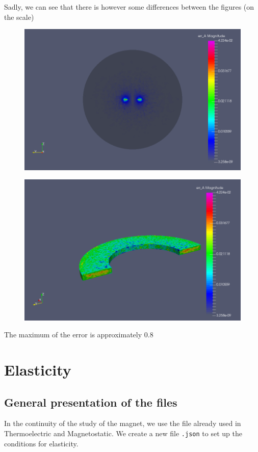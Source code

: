 \documentclass[11pt]{amsart}
\begin{document}
Sadly, we can see that there is however some differences between the figures (on the scale)


\begin{figure}
\centering\includegraphics[width=4.75truein]{./images/learning/magnetostatic/Cartesian_potential_error.png}


\end{figure}

\begin{figure}
\centering\includegraphics[width=4.75truein]{./images/learning/magnetostatic/Cartesian_potential_error_zoom.png}


\end{figure}

The maximum of the error is approximately 0.8%


\hypertarget{x-\textbf{elasticity}}{\section{\textbf{Elasticity}}}
\hypertarget{x-general-presentation-of-the-files}{\subsection{General presentation of the files}}
In the continuity of the study of the magnet, we use the file already used in Thermoelectric and Magnetostatic.
We create a new file \texttt{.json} to set up the conditions for elasticity.
\end{document}
